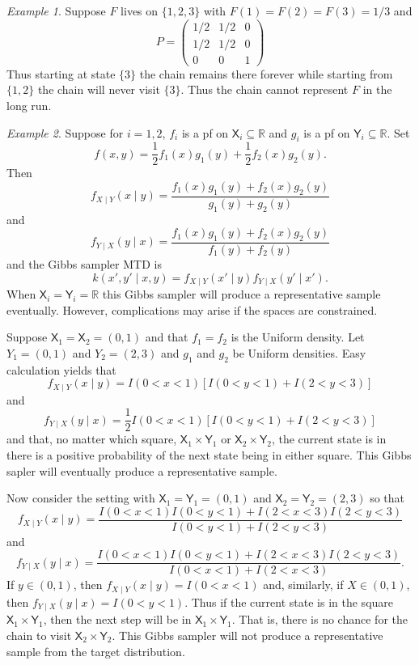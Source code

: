 \documentclass[12pt]{article}
\theoremstyle{plain}
\theoremstyle{definition}
\theoremstyle{remark}
\newtheorem{example}{Example}[section]
\newcommand{\X}{\mathsf{X}}
\newcommand{\Y}{\mathsf{Y}}
\newcommand{\real}{\mathbb{R}}
\begin{document}
 \begin{example}
Suppose $F$ lives on $\{ 1, 2,3\}$ with $F(1) =  F(2) = F(3) = 1/3$ and
   \[
     P = \begin{pmatrix}
       1/2 & 1/2 & 0 \\
       1/2 & 1/2 & 0\\
       0 & 0 & 1
       \end{pmatrix}
     \]
     Thus starting at state $\{3\}$ the chain remains there forever
     while starting from $\{1, 2\}$ the chain will never visit
     $\{3\}$.  Thus the chain cannot represent $F$ in the long run.
 \end{example}
 

 \begin{example}
   \label{mcmc:ex:disc_Gibbs}
Suppose for $i=1,2$, $f_i$ is a pf on $\X_i \subseteq \real$ and $g_i$
is a pf on $\Y_i \subseteq \real$.
Set
\[
f(x,y) = \frac{1}{2} f_1(x) g_1(y) + \frac{1}{2} f_2(x) g_2(y).
\]
Then
\[
f_{X \mid Y}(x \mid y) = \frac{f_1(x) g_1(y) + f_2(x) g_2(y)}{g_1(y) + g_2(y)}
\]
and
\[
f_{Y\mid X}(y \mid x) = \frac{f_1(x) g_1(y) + f_2(x) g_2(y)}{f_1(y) + f_2(y)}
\]
and the Gibbs sampler MTD is
\[
k(x', y' \mid x, y) = f_{X \mid Y}(x' \mid y) f_{Y\mid X}(y' \mid x') .
\]
When $\X_i = \Y_i = \real$ this Gibbs sampler will produce a
representative sample eventually.  However, complications may arise if
the spaces are constrained.

Suppose $\X_1 = \X_2 = (0, 1)$ and that $f_1 = f_2$ is the
Uniform density.  Let $Y_1 = (0, 1)$ and $Y_2 = (2, 3)$ and $g_1$
and $g_2$ be Uniform densities.  Easy calculation yields that
\[
f_{X \mid Y} (x \mid y) = I(0 < x < 1) \left[ I(0 < y < 1) + I(2 < y <
3)\right]
\]
and
\[
f_{Y \mid X}(y \mid x) = \frac{1}{2} I(0 < x < 1) \left[ I(0 < y < 1) + I(2 < y <
3)\right]
\]
and that, no matter which square, $\X_1 \times \Y_1$ or $\X_2 \times
\Y_2$,  the current state is in there is a positive probability of the
next state being in either square.  This Gibbs sapler will eventually
produce a representative sample.

Now consider the setting with $\X_1 = \Y_1 = (0,1)$ and $\X_2 = \Y_2 =
(2,3)$ so that
\[
f_{X \mid Y} (x \mid y) = \frac{I(0 < x < 1) I(0 < y < 1) + I(2 < x < 3)I(2 < y <
3)}{I(0 < y < 1) + I(2 < y < 3)}
\]
and
\[
f_{Y \mid X} (y \mid x) = \frac{I(0 < x < 1) I(0 < y < 1) + I(2 < x < 3)I(2 < y <
3)}{I(0 < x < 1) + I(2 < x < 3)}.
\]
If $ y \in (0,1)$, then $f_{X \mid Y} (x \mid y) =  I(0 < x <1)$ and,
similarly, if $X \in (0,1)$, then $f_{Y \mid X} (y \mid x) = I(0 < y <
1)$.  Thus if the current state is in the square $\X_1 \times \Y_1$,
then the next step will be in $\X_1 \times \Y_1$.  That is, there is
no chance for the chain to visit $\X_2 \times \Y_2$.  This Gibbs
sampler will not produce a representative sample from the target
distribution.
\end{example}
\end{document}
